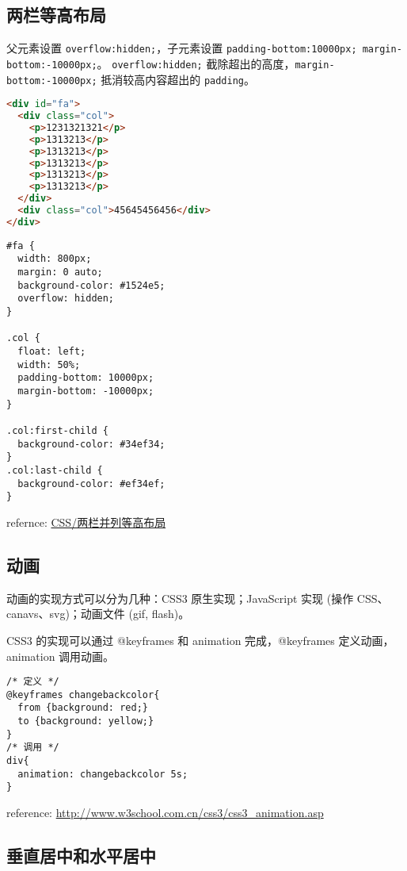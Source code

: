 \subsection{两栏等高布局}\label{ux4e24ux680fux7b49ux9ad8ux5e03ux5c40}

父元素设置 \lstinline!overflow:hidden;!，子元素设置
\lstinline!padding-bottom:10000px; margin-bottom:-10000px;!。
\lstinline!overflow:hidden;!
截除超出的高度，\lstinline!margin-bottom:-10000px;! 抵消较高内容超出的
\lstinline!padding!。

\begin{lstlisting}[language=HTML]
<div id="fa">
  <div class="col">
    <p>1231321321</p>
    <p>1313213</p>
    <p>1313213</p>
    <p>1313213</p>
    <p>1313213</p>
    <p>1313213</p>
  </div>
  <div class="col">45645456456</div>
</div>
\end{lstlisting}

\begin{lstlisting}
#fa {
  width: 800px;
  margin: 0 auto;
  background-color: #1524e5;
  overflow: hidden;
}

.col {
  float: left;
  width: 50%;
  padding-bottom: 10000px;
  margin-bottom: -10000px;
}

.col:first-child {
  background-color: #34ef34;
}
.col:last-child {
  background-color: #ef34ef;
}
\end{lstlisting}

refernce:
\href{http://segmentfault.com/a/1190000000625584}{CSS/两栏并列等高布局}

\subsection{动画}\label{ux52a8ux753b}

动画的实现方式可以分为几种：CSS3 原生实现；JavaScript 实现 (操作
CSS、canavs、svg)；动画文件 (gif, flash)。

CSS3 的实现可以通过 @keyframes 和 animation 完成，@keyframes
定义动画，animation 调用动画。

\begin{lstlisting}
/* 定义 */
@keyframes changebackcolor{
  from {background: red;}
  to {background: yellow;}
}
/* 调用 */
div{
  animation: changebackcolor 5s;
}
\end{lstlisting}

reference: \url{http://www.w3school.com.cn/css3/css3_animation.asp}

\subsection{垂直居中和水平居中}\label{ux5782ux76f4ux5c45ux4e2dux548cux6c34ux5e73ux5c45ux4e2d}

